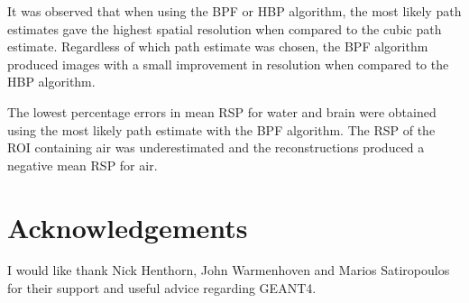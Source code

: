 \documentclass[11pt,a4paper]{article}
\begin{document}
It was observed that when using the BPF or HBP algorithm, the most likely path estimates gave the highest spatial resolution when compared to the cubic path estimate. Regardless of which path estimate was chosen, the BPF algorithm produced images with a small improvement in resolution when compared to the HBP algorithm. 

The lowest percentage errors in mean RSP for water and brain were obtained using the most likely path estimate with the BPF algorithm. The RSP of the ROI containing air was underestimated and the reconstructions produced a negative mean RSP for air.

\section{Acknowledgements}
I would like thank Nick Henthorn, John Warmenhoven and Marios Satiropoulos for their support and useful advice regarding GEANT4.

%

%
\printbibliography
\end{document}
